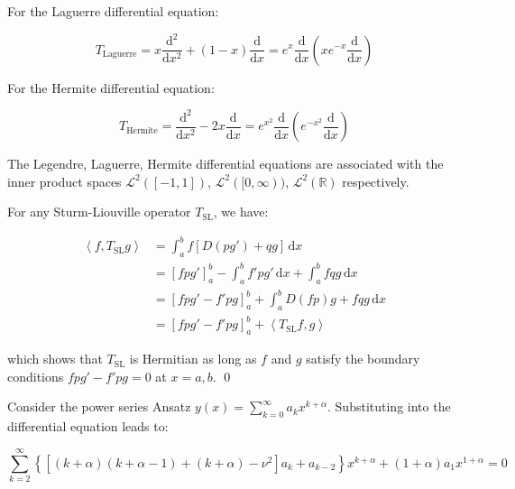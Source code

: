 \documentclass[12pt]{article}
\begin{document}
For the Laguerre differential equation:

\begin{equation}
    T_{\text{Laguerre}} = x \frac{\mathrm{d}^{2}}{\mathrm{d}x^{2}} + (1 - x) \frac{\mathrm{d}}{\mathrm{d}x} = e^{x} \frac{\mathrm{d}}{\mathrm{d}x} \left( x e^{-x} \frac{\mathrm{d}}{\mathrm{d}x} \right)
\end{equation}

For the Hermite differential equation:

\begin{equation}
    T_{\text{Hermite}} = \frac{\mathrm{d}^{2}}{\mathrm{d}x^{2}} - 2x \frac{\mathrm{d}}{\mathrm{d}x} = e^{x^{2}} \frac{\mathrm{d}}{\mathrm{d}x} \left( e^{-x^{2}} \frac{\mathrm{d}}{\mathrm{d}x} \right)
\end{equation}

The Legendre, Laguerre, Hermite differential equations are associated with the inner product spaces $\mathcal{L}^{2}([-1, 1])$, $\mathcal{L}^{2}([0, \infty))$, $\mathcal{L}^{2}(\mathbb{R})$ respectively.

For any Sturm-Liouville operator $T_{\text{SL}}$, we have:

\begin{equation}
\begin{split}
    \left\langle f, T_{\text{SL}} g \right\rangle &= \int_{a}^{b} f [D(p g') + q g] \, \mathrm{d}x \\
    &= \left[ f p g' \right]_{a}^{b} - \int_{a}^{b} f' p g' \, \mathrm{d}x + \int_{a}^{b} f q g \, \mathrm{d}x \\
    &= \left[ f p g' - f' p g \right]_{a}^{b} + \int_{a}^{b} D(f p) g + f q g \, \mathrm{d}x \\
    &= \left[ f p g' - f' p g \right]_{a}^{b} + \left\langle T_{\text{SL}} f, g \right\rangle
\end{split}
\end{equation}

which shows that $T_{\text{SL}}$ is Hermitian as long as $f$ and $g$ satisfy the boundary conditions $f p g' - f' p g = 0$ at $x = a, b$.
\qed



Consider the power series Ansatz $y(x) = \sum_{k=0}^{\infty} a_{k} x^{k + \alpha}$. Substituting into the differential equation leads to:

\begin{equation}
    \sum_{k=2}^{\infty} \left\{ \left[ (k + \alpha)(k + \alpha - 1) + (k + \alpha) - \nu^{2} \right]a_{k} + a_{k-2} \right\} x^{k + \alpha} + (1 + \alpha) a_{1} x^{1 + \alpha} = 0
\end{equation}
\end{document}

